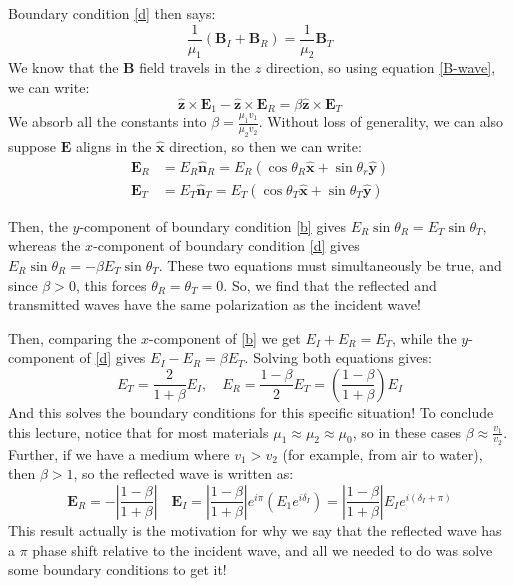 Boundary condition \ref{d} then says:
\[
	\frac{1}{\mu_1} (\mathbf{B}_I + \mathbf{B}_R) = \frac{1}{\mu_2} \mathbf{B}_T
\]
We know that the \( \mathbf{B} \) field travels in the \( z \) direction, so using equation \ref{B-wave}, we
can write:
\[
	\mathbf{\hat{z}} \times \mathbf{E}_1 - \mathbf{\hat{z}} \times \mathbf{E}_R = \beta
	\mathbf{\hat{z}} \times \mathbf{E}_T
\]
We absorb all the constants into \( \beta = \frac{\mu_1v_1}{\mu_2v_2} \). Without loss of generality, we can
also suppose \( \mathbf{E} \) aligns in the \( \mathbf{\hat{x}} \) direction, so then we can write:
\begin{align*}
	\mathbf{E}_R &= E_R \mathbf{\hat{n}}_R = E_R (\cos \theta_R \mathbf{\hat{x}} + \sin \theta_r
	\mathbf{\hat{y}}) \\
	\mathbf{E}_T &= E_T \mathbf{\hat{n}}_T = E_T\left( \cos \theta_T \mathbf{\hat{x}} + \sin \theta_T
	\hat{\mathbf{y}} \right)
\end{align*}

Then, the \( y \)-component of boundary condition \ref{b} gives \( E_R \sin \theta_R = E_T \sin \theta_T \),
whereas the \( x \)-component of boundary condition \ref{d} gives \( E_R \sin \theta_R = -\beta E_T \sin
\theta_T \). These two equations must simultaneously be true, and since \( \beta >0 \), this forces \(
\theta_R = \theta_T = 0 \). So, we find that the reflected and transmitted waves have the same polarization
as the incident wave! 

Then, comparing the \( x \)-component of \ref{b} we get \( E_I + E_R = E_T \), while the \( y \)-component of
\ref{d} gives \( E_I - E_R = \beta E_T \). Solving both equations gives:
\[
	E_T = \frac{2}{1 + \beta}E_I , \quad E_R = \frac{1-\beta}{2}E_T = \left( \frac{1 - \beta}{1 + \beta}
	\right)E_I
\]
And this solves the boundary conditions for this specific situation! To conclude this lecture, notice that
for most materials \( \mu_1 \approx \mu_2 \approx \mu_0 \), so in these cases \( \beta \approx
\frac{v_1}{v_2} \). Further, if we have a medium where \( v_1 > v_2 \) (for example, from air to water), then
\( \beta > 1 \), so the reflected wave is written as:
\[
	\mathbf{E}_R = - \left| \frac{1 - \beta}{1 + \beta} \right|\quad \mathbf{E}_I = \left| \frac{1 - \beta}{1 +
	\beta} \right|e^{ i \pi} \left(E_1 e^{i \delta_I}\right) 
	= \left| \frac{1- \beta}{1 + \beta} \right|E_I e^{i(\delta_I
	+ \pi)}
\]
 This result actually is the motivation for why we say that the reflected wave has a \( \pi \) phase shift
 relative to the incident wave, and all we needed to do was solve some boundary conditions to get it!  
 




